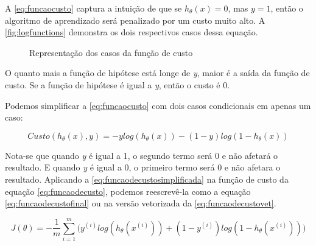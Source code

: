 A \autoref{eq:funcaocusto} captura a intuição de que se $h_\theta(x) = 0$, mas $y = 1$, então o algoritmo de aprendizado será penalizado por um custo muito alto. A \autoref{fig:logfunctions} demonstra os dois respectivos casos dessa equação.


\begin{figure}[!htb]
  \caption{Representação dos casos da função de custo}
  \label{fig:logfunctions}
  \begin{center}
  \end{center}
\end{figure}


O quanto mais a função de hipótese está longe de \textit{y}, maior é a saída da função de custo. Se a função de hipótese é igual a \textit{y}, então o custo é 0.

Podemos simplificar a \autoref{eq:funcaocusto} com dois casos condicionais em apenas um caso:

\begin{equation} 
\label{eq:funcaodecustosimplificada}
Custo(h_{\theta}(x), y) = -ylog(h_{\theta}(x)) - (1-y)log(1 - h_{\theta}(x))
\end{equation}

Nota-se que quando \textit{y} é igual a 1, o segundo termo será 0 e não afetará o resultado. E quando \textit{y} é igual a 0, o primeiro termo será 0 e não afetara o resultado. Aplicando a \autoref{eq:funcaodecustosimplificada} na função de custo da equação \autoref{eq:funcaodecusto}, podemos reescrevê-la como a equação \autoref{eq:funcaodecustofinal} ou na versão vetorizada da \autoref{eq:funcaodecustovet}.

\begin{equation}
\label{eq:funcaodecustofinal}
J(\theta) = - \frac{1}{m}\sum\limits_{i=1}^{m}\Big( y^{(i)}log(h_{\theta}(x^{(i)})) + (1-y^{(i)})log(1 - h_{\theta}(x^{(i)})) \Big)
\end{equation}

